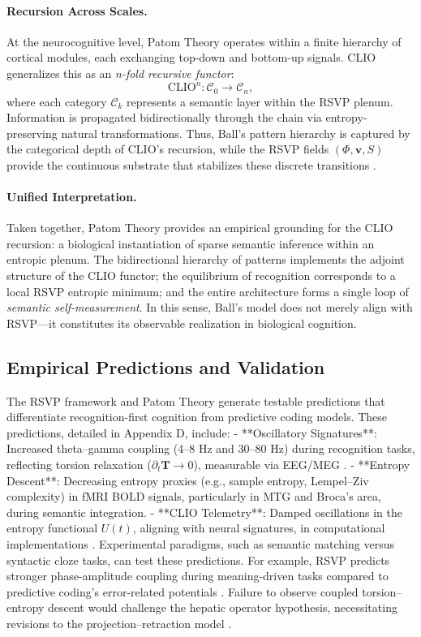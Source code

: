 \documentclass[11pt]{article}
\begin{document}
\paragraph{Recursion Across Scales.}
At the neurocognitive level, Patom Theory operates within a finite hierarchy of cortical modules, each exchanging top-down and bottom-up signals. CLIO generalizes this as an \emph{n-fold recursive functor}:
\[
\mathrm{CLIO}^n : \mathcal{C}_0 \to \mathcal{C}_n,
\]
where each category $\mathcal{C}_k$ represents a semantic layer within the RSVP plenum. Information is propagated bidirectionally through the chain via entropy-preserving natural transformations. Thus, Ball’s pattern hierarchy is captured by the categorical depth of CLIO’s recursion, while the RSVP fields $(\Phi, \mathbf{v}, S)$ provide the continuous substrate that stabilizes these discrete transitions \citep{jackendoff2012semantics, pinker2005computational}.

\paragraph{Unified Interpretation.}
Taken together, Patom Theory provides an empirical grounding for the CLIO recursion: a biological instantiation of sparse semantic inference within an entropic plenum. The bidirectional hierarchy of patterns implements the adjoint structure of the CLIO functor; the equilibrium of recognition corresponds to a local RSVP entropic minimum; and the entire architecture forms a single loop of \emph{semantic self-measurement}. In this sense, Ball’s model does not merely align with RSVP---it constitutes its observable realization in biological cognition.

\subsection{Empirical Predictions and Validation}
\label{subsec:empirical-validation}
The RSVP framework and Patom Theory generate testable predictions that differentiate recognition-first cognition from predictive coding models. These predictions, detailed in Appendix D, include:
- **Oscillatory Signatures**: Increased theta--gamma coupling (4--8 Hz and 30--80 Hz) during recognition tasks, reflecting torsion relaxation ($\partial_t \mathbf{T} \to 0$), measurable via EEG/MEG \citep{alivisatos2012brain}.
- **Entropy Descent**: Decreasing entropy proxies (e.g., sample entropy, Lempel–Ziv complexity) in fMRI BOLD signals, particularly in MTG and Broca’s area, during semantic integration.
- **CLIO Telemetry**: Damped oscillations in the entropy functional $U(t)$, aligning with neural signatures, in computational implementations \citep{cheng2025clio}.
Experimental paradigms, such as semantic matching versus syntactic cloze tasks, can test these predictions. For example, RSVP predicts stronger phase-amplitude coupling during meaning-driven tasks compared to predictive coding’s error-related potentials \citep{friston2010free}. Failure to observe coupled torsion--entropy descent would challenge the hepatic operator hypothesis, necessitating revisions to the projection--retraction model \citep{ball2020patom}.
\end{document}
